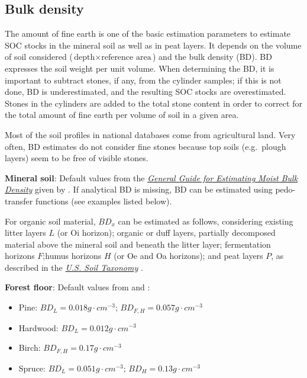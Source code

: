 \documentclass[10pt,b5paper,]{book}
\theoremstyle{definition}
\theoremstyle{definition}
\theoremstyle{definition}
\theoremstyle{remark}
\begin{document}
\hypertarget{bulk-density}{%
\subsection{Bulk density}\label{bulk-density}}

The amount of fine earth is one of the basic estimation parameters to
estimate SOC stocks in the mineral soil as well as in peat layers. It
depends on the volume of soil considered
(\(\text{depth} \times \text{reference area}\)) and the bulk density
(BD). BD expresses the soil weight per unit volume. When determining the
BD, it is important to subtract stones, if any, from the cylinder
samples; if this is not done, BD is underestimated, and the resulting
SOC stocks are overestimated. Stones in the cylinders are added to the
total stone content in order to correct for the total amount of fine
earth per volume of soil in a given area.

Most of the soil profiles in national databases come from agricultural
land. Very often, BD estimates do not consider fine stones because top
soils (e.g.~plough layers) seem to be free of visible stones.

\textbf{Mineral soil}: Default values from the
\href{https://www.nrcs.usda.gov/wps/portal/nrcs/detail/soils/survey/office/ssr10/tr/?cid=nrcs144p2_074844}{\emph{General
Guide for Estimating Moist Bulk Density}} given by \citet{USDA_2018}. If
analytical BD is missing, BD can be estimated using pedo-transfer
functions (see examples listed below).

For organic soil material, \(BD_x\) can be estimated as follows,
considering existing litter layers \(L\) (or Oi horizon); organic or
duff layers, partially decomposed material above the mineral soil and
beneath the litter layer; fermentation horizons \(F\);humus horizons
\(H\) (or Oe and Oa horizons); and peat layers \(P\), as described in
the
\href{https://www.nrcs.usda.gov/Internet/FSE_DOCUMENTS/nrcs142p2_051232.pdf}{\emph{U.S.
Soil Taxonomy}} \citep{united1975soil}.

\textbf{Forest floor}: Default values from \citet{barney_forest_1981}
and \citet{ottmar_litter_2007}:

\begin{itemize}
\item
  Pine: \(BD_{L} = 0.018 g \cdot cm^{-3}\);
  \(BD_{F,H} = 0.057 g \cdot cm^{-3}\)
\item
  Hardwood: \(BD_{L} = 0.012 g \cdot cm^{-3}\)
\item
  Birch: \(BD_{F,H} = 0.17 g \cdot cm^{-3}\)
\item
  Spruce: \(BD_{L} = 0.051 g \cdot cm^{-3}\);
  \(BD_{H}= 0.13 g \cdot cm^{-3}\)
\end{itemize}
\end{document}
